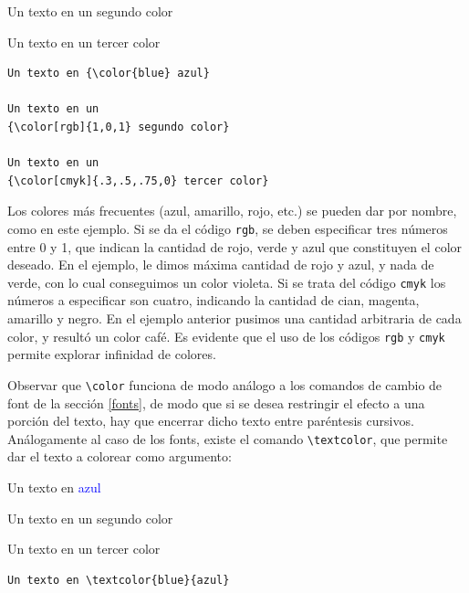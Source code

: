 {{\begin{minipage}[t]{5cm}
Un texto en un  
{\color[rgb]{1,0,1} segundo color}

Un texto en un  
{\color[cmyk]{.3,.5,.75,0} tercer color}
\end{minipage}
\hspace{1.5cm}
\begin{minipage}[t]{5cm}
\begin{verbatim}
Un texto en {\color{blue} azul}

Un texto en un  
{\color[rgb]{1,0,1} segundo color}

Un texto en un  
{\color[cmyk]{.3,.5,.75,0} tercer color}
\end{verbatim}
\end{minipage}
}
\vspace{.3cm}

Los colores m\'as frecuentes (azul, amarillo, rojo, etc.) se pueden
dar por nombre, como en este ejemplo. 
Si se da el c\'odigo \verb+rgb+, se deben especificar tres n\'umeros
entre 0 y 1, que indican la cantidad de rojo, verde y azul que
constituyen el color deseado. En el ejemplo, le dimos m\'axima
cantidad de rojo y azul, y nada de verde, con lo cual conseguimos un
color violeta. Si se trata del c\'odigo \verb+cmyk+ los n\'umeros a
especificar son cuatro, indicando la cantidad de cian, magenta,
amarillo y negro. En el ejemplo anterior pusimos una cantidad
arbitraria de cada color, y result\'o un color caf\'e. Es evidente que
el uso de los c\'odigos \verb+rgb+ y \verb+cmyk+ permite explorar
infinidad de colores.

Observar que \verb+\color+ funciona de modo an\'alogo a los comandos
de cambio de font de la secci\'on \ref{fonts}, de modo que si se desea
restringir el efecto a una porci\'on del texto, hay que encerrar dicho
texto entre par\'entesis cursivos. An\'alogamente al caso de los
fonts, existe el comando \verb+\textcolor+, que permite dar el
texto a colorear como argumento: 

\vspace{.3cm}
{\small
\begin{minipage}[t]{5cm}
Un texto en \textcolor{blue}{azul}

Un texto en un  
\textcolor[rgb]{1,0,1}{segundo color}

Un texto en un  
\textcolor[cmyk]{.3,.5,.75,0}{tercer color}
\end{minipage}
\hspace{1.5cm}
\begin{minipage}[t]{5cm}
\begin{verbatim}
Un texto en \textcolor{blue}{azul}


\end{verbatim}
\end{minipage}}}
